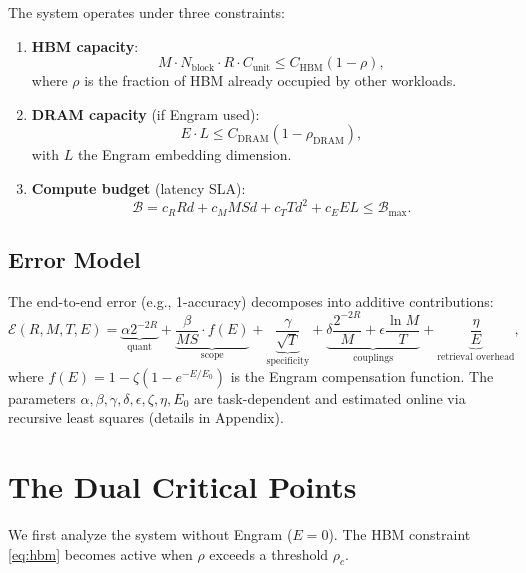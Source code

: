 \documentclass[11pt,a4paper]{article}
\theoremstyle{plain}
\theoremstyle{definition}
\begin{document}
The system operates under three constraints:
\begin{enumerate}
    \item \textbf{HBM capacity}:
        \begin{equation}
            M \cdot N_{\text{block}} \cdot R \cdot C_{\text{unit}} \le C_{\text{HBM}} (1-\rho), \label{eq:hbm}
        \end{equation}
        where $\rho$ is the fraction of HBM already occupied by other workloads.
    \item \textbf{DRAM capacity} (if Engram used):
        \begin{equation}
            E \cdot L \le C_{\text{DRAM}} (1-\rho_{\text{DRAM}}), \label{eq:dram}
        \end{equation}
        with $L$ the Engram embedding dimension.
    \item \textbf{Compute budget} (latency SLA):
        \begin{equation}
            \mathcal{B} = c_R R d + c_M M S d + c_T T d^2 + c_E E L \le \mathcal{B}_{\max}. \label{eq:compute}
        \end{equation}
\end{enumerate}

\subsection{Error Model}
The end-to-end error (e.g., 1-accuracy) decomposes into additive contributions:
\begin{equation}
\label{eq:error}
\mathcal{E}(R,M,T,E) = \underbrace{\alpha 2^{-2R}}_{\text{quant}} + \underbrace{\frac{\beta}{MS} \cdot f(E)}_{\text{scope}} + \underbrace{\frac{\gamma}{\sqrt{T}}}_{\text{specificity}} + \underbrace{\delta \frac{2^{-2R}}{M} + \epsilon \frac{\ln M}{T}}_{\text{couplings}} + \underbrace{\frac{\eta}{E}}_{\text{retrieval overhead}},
\end{equation}
where $f(E)=1-\zeta(1-e^{-E/E_0})$ is the Engram compensation function. The parameters $\alpha,\beta,\gamma,\delta,\epsilon,\zeta,\eta,E_0$ are task-dependent and estimated online via recursive least squares (details in Appendix).

\section{The Dual Critical Points}
\label{sec:dual}
We first analyze the system without Engram ($E=0$). The HBM constraint \eqref{eq:hbm} becomes active when $\rho$ exceeds a threshold $\rho_c$.
\end{document}
